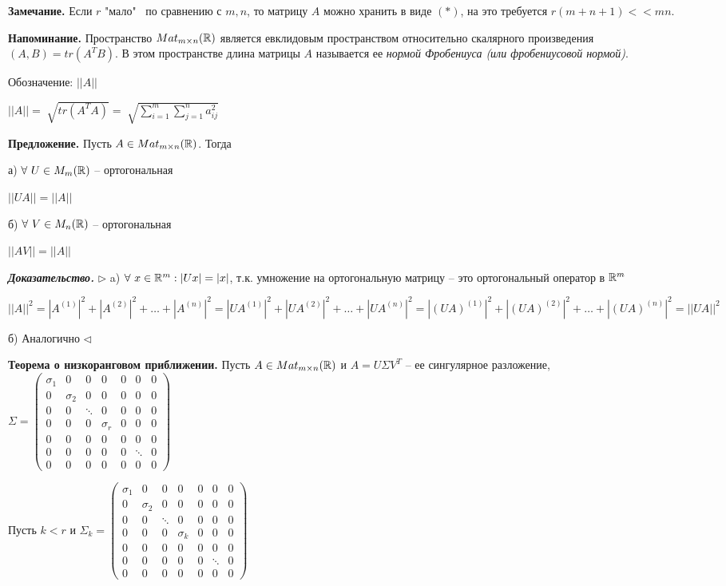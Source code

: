 \bigskip
\textbf{Замечание.} Если $r$ "мало" \ по сравнению с $m, n$, то матрицу $A$ можно хранить в виде $(*)$, на это требуется $r(m + n + 1) << mn$.

\bigskip
\textbf{Напоминание.} Пространство $Mat_{m \times n} (\mathbb{R})$ является евклидовым пространством относительно скалярного произведения $(A, B) = tr(A^T B)$. В этом пространстве длина матрицы $A$ называется ее \textit{нормой Фробениуса (или фробениусовой нормой)}.

Обозначение: $||A||$

$||A|| = \sqrt[]{tr(A^T A)} = \sqrt[]{\sum\limits_{i=1}^m \sum\limits_{j=1}^n a_{ij}^2}$

\bigskip
\textbf{Предложение.} Пусть $A \in Mat_{m \times n} (\mathbb{R})$. Тогда

а) $\forall \ U \in M_m(\mathbb{R})$ -- ортогональная

$||UA|| = ||A||$

б) $\forall \ V \in M_n(\mathbb{R})$ -- ортогональная

$||AV|| = ||A||$

\bigskip
\textbf{\textit{Доказательство.}} $\rhd$ a) $\forall \ x \in \mathbb{R}^m: |Ux| = |x|$, т.к. умножение на ортогональную матрицу -- это ортогональный оператор в $\mathbb{R}^m$

$||A||^2 = |A^{(1)}|^2 + |A^{(2)}|^2 + \dots + |A^{(n)}|^2 = |UA^{(1)}|^2 + |UA^{(2)}|^2 + \dots + |UA^{(n)}|^2 = |(UA)^{(1)}|^2 + |(UA)^{(2)}|^2 + \dots + |(UA)^{(n)}|^2 = ||UA||^2$

б) Аналогично $\lhd$

\bigskip
\textbf{Теорема о низкоранговом приближении.} Пусть $A \in Mat_{m \times n} (\mathbb{R})$ и $A = U \Sigma V^T$ -- ее сингулярное разложение, $\Sigma = \begin{pmatrix} \sigma_1 & 0 & 0 & 0 & 0 & 0 & 0 \\  0 & \sigma_2 & 0 & 0 & 0 & 0 & 0 \\ 0 & 0 & \ddots & 0 & 0 & 0 & 0 \\ 0 & 0 & 0 & \sigma_r & 0 & 0 & 0 \\ 0 & 0 & 0 & 0 & 0 & 0 & 0 \\ 0 & 0 & 0 & 0 & 0 & \ddots & 0 \\ 0 & 0 & 0 & 0 & 0 & 0 & 0 \end{pmatrix}$

Пусть $k < r$ и $\Sigma_k = \begin{pmatrix} \sigma_1 & 0 & 0 & 0 & 0 & 0 & 0 \\  0 & \sigma_2 & 0 & 0 & 0 & 0 & 0 \\ 0 & 0 & \ddots & 0 & 0 & 0 & 0 \\ 0 & 0 & 0 & \sigma_k & 0 & 0 & 0 \\ 0 & 0 & 0 & 0 & 0 & 0 & 0 \\ 0 & 0 & 0 & 0 & 0 & \ddots & 0 \\ 0 & 0 & 0 & 0 & 0 & 0 & 0 \end{pmatrix}$

